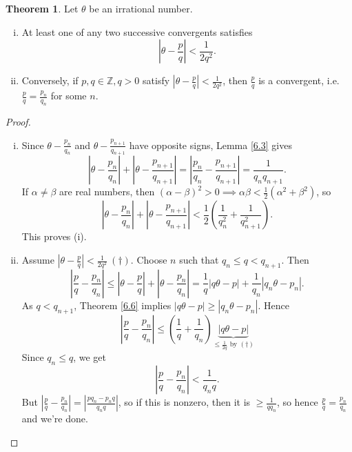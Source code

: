 \documentclass{article}
\theoremstyle{definition}
\newtheorem{theorem}{Theorem}[section]
\begin{document}
\begin{theorem}\label{6.8}
    Let $\theta$ be an irrational number. 
    \begin{enumerate}[(i)]
        \item At least one of any two successive convergents satisfies $$\left|\theta-\frac{p}{q}\right|<\frac{1}{2q^2}.$$ 
        \item Conversely, if $p,q \in \mathbb{Z}, q>0$ satisfy $\left|\theta-\frac{p}{q}\right|<\frac{1}{2q^2}$, then $\frac{p}{q}$ is a convergent, i.e. $\frac{p}{q}=\frac{p_n}{q_n}$ for some $n$.
    \end{enumerate}
\end{theorem}
\begin{proof}
    \begin{enumerate}[(i)]
        \item Since $\theta-\frac{p_n}{q_n}$ and $\theta-\frac{p_{n+1}}{q_{n+1}}$ have opposite signs, Lemma \ref{6.3} gives \[
        \left|\theta-\frac{p_n}{q_n}\right| + \left|\theta - \frac{p_{n+1}}{q_{n+1}}\right| = \left|\frac{p_n}{q_n}-\frac{p_{n+1}}{q_{n+1}} \right| = \frac{1}{q_nq_{n+1}}.
        \]
        If $\alpha \neq \beta$ are real numbers, then $(\alpha-\beta)^2>0 \implies \alpha \beta < \frac{1}{2}(\alpha^2+\beta^2)$, so \[
        \left|\theta - \frac{p_n}{q_n} \right| + \left|\theta-\frac{p_{n+1}}{q_{n+1}}   \right| < \frac{1}{2} \left(\frac{1}{q_n^2}+\frac{1}{q_{n+1}^2} \right).
        \] This proves (i).
        \item Assume $\left|\theta-\frac{p}{q}\right|<\frac{1}{2q^2} ~(\dagger)$. Choose $n$ such that $q_n\le q <q_{n+1}$. Then \[
        \left|\frac{p}{q}-\frac{p_n}{q_n}\right| \le \left|\theta-\frac{p}{q}\right| + \left|\theta-\frac{p_n}{q_n}\right| = \frac{1}{q} |q \theta - p| + \frac{1}{q_n} |q_n \theta - p_n|.
        \]
        As $q<q_{n+1}$, Theorem \ref{6.6} implies $|q \theta - p| \ge |q_n \theta - p_n|.$ Hence \[
            \left|\frac{p}{q}-\frac{p_n}{q_n}\right| \le \left(\frac{1}{q}+\frac{1}{q_n}\right) \underbrace{|q \theta - p|}_{\le \frac{1}{2q} \text{ by }(\dagger)}
        \]
        Since $q_n\le q$, we get \[
            \left|\frac{p}{q}-\frac{p_n}{q_n}\right| < \frac{1}{q_n q}.
        \]
        But $\left|\frac{p}{q}-\frac{p_n}{q_n}\right| = \left|\frac{pq_n-p_nq}{q_nq}\right|$, so if this is nonzero, then it is $\ge \frac{1}{qq_n}$, so hence $\frac{p}{q}=\frac{p_n}{q_n}$ and we're done.
    \end{enumerate}
\end{proof}
\end{document}
